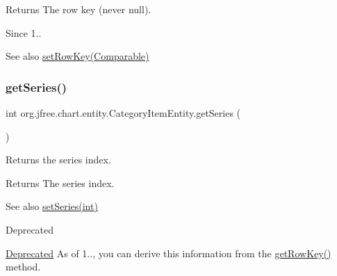 \begin{DoxyReturn}{Returns}
The row key (never {\ttfamily null}).
\end{DoxyReturn}
\begin{DoxySince}{Since}
1..
\end{DoxySince}
\begin{DoxySeeAlso}{See also}
\mbox{\hyperlink{classorg_1_1jfree_1_1chart_1_1entity_1_1_category_item_entity_ab9e5d63db61fe4152a86acc4de0d5b72}{set\+Row\+Key(\+Comparable)}} 
\end{DoxySeeAlso}
\mbox{\label{classorg_1_1jfree_1_1chart_1_1entity_1_1_category_item_entity_ad27d6ea7114f0775b0339acc79ce9d56}} 
\subsubsection{\texorpdfstring{get\+Series()}{getSeries()}}
{\footnotesize\ttfamily int org.\+jfree.\+chart.\+entity.\+Category\+Item\+Entity.\+get\+Series (\begin{DoxyParamCaption}{ }\end{DoxyParamCaption})}

Returns the series index.

\begin{DoxyReturn}{Returns}
The series index.
\end{DoxyReturn}
\begin{DoxySeeAlso}{See also}
\mbox{\hyperlink{classorg_1_1jfree_1_1chart_1_1entity_1_1_category_item_entity_a914cb3b56be73223fa862fe797ab73df}{set\+Series(int)}}
\end{DoxySeeAlso}
\begin{DoxyRefDesc}{Deprecated}
\item[\mbox{\hyperlink{deprecated__deprecated000041}{Deprecated}}]As of 1.., you can derive this information from the \mbox{\hyperlink{classorg_1_1jfree_1_1chart_1_1entity_1_1_category_item_entity_a8d21cdafb1a07e935df8df6d20369814}{get\+Row\+Key()}} method. \end{DoxyRefDesc}
\mbox{\label{classorg_1_1jfree_1_1chart_1_1entity_1_1_category_item_entity_a23d787fb513e3f167b91eea19732214e}} 
